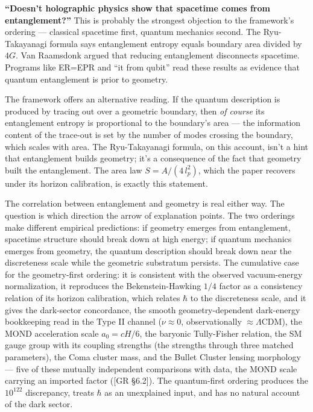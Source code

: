 \documentclass[
]{article}
\begin{document}
\textbf{``Doesn't holographic physics show that spacetime comes from
entanglement?''} This is probably the strongest objection to the
framework's ordering --- classical spacetime first, quantum mechanics
second. The Ryu-Takayanagi formula says entanglement entropy equals
boundary area divided by \(4G\). Van Raamsdonk argued that reducing
entanglement disconnects spacetime. Programs like ER=EPR and ``it from
qubit'' read these results as evidence that quantum entanglement is
prior to geometry.

The framework offers an alternative reading. If the quantum description
is produced by tracing out over a geometric boundary, then \emph{of
course} its entanglement entropy is proportional to the boundary's area
--- the information content of the trace-out is set by the number of
modes crossing the boundary, which scales with area. The Ryu-Takayanagi
formula, on this account, isn't a hint that entanglement builds
geometry; it's a consequence of the fact that geometry built the
entanglement. The area law \(S = A/(4\,l_p^2)\), which the paper
recovers under its horizon calibration, is exactly this statement.

The correlation between entanglement and geometry is real either way.
The question is which direction the arrow of explanation points. The two
orderings make different empirical predictions: if geometry emerges from
entanglement, spacetime structure should break down at high energy; if
quantum mechanics emerges from geometry, the quantum description should
break down near the discreteness scale while the geometric substratum
persists. The cumulative case for the geometry-first ordering: it is
consistent with the observed vacuum-energy normalization, it reproduces
the Bekenstein-Hawking \(1/4\) factor as a consistency relation of its
horizon calibration, which relates \(\hbar\) to the discreteness scale,
and it gives the dark-sector concordance, the smooth geometry-dependent
dark-energy bookkeeping read in the Type II channel (\(\nu \approx 0\),
observationally \(\approx \Lambda\)CDM), the MOND acceleration scale
\(a_0 = cH/6\), the baryonic Tully-Fisher relation, the SM gauge group
with its coupling strengths (the strengths through three matched
parameters), the Coma cluster mass, and the Bullet Cluster lensing
morphology --- five of these mutually independent comparisons with data,
the MOND scale carrying an imported factor ({[}GR §6.2{]}). The
quantum-first ordering produces the \(10^{122}\) discrepancy, treats
\(\hbar\) as an unexplained input, and has no natural account of the
dark sector.
\end{document}

